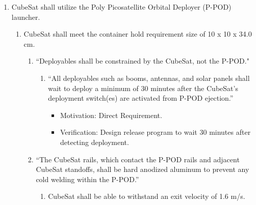 \begin{enumerate}
\begin{enumerate}
\begin{enumerate}
\begin{enumerate}
                \begin{itemize}
                        \item Motivation: Delicate components such as PCBs and antenna have natural frequencies which must be avoided to avoid resonance. Resonance could result in the failure of components.
                        \item Verification: Use ANSYS model analysis features on specific parts and on the assembled CAD model.
                    \end{itemize}
        \end{enumerate}
        \end{enumerate}
    \end{enumerate}  %
    \item CubeSat shall utilize the Poly Picosatellite Orbital Deployer (P-POD) launcher.
    \begin{enumerate}
        \item CubeSat shall meet the container hold requirement size of 10 x 10 x 34.0 cm. 
        \begin{enumerate}
            \item  “Deployables shall be constrained by the CubeSat, not the P-POD." \cite{CSS} 
                \begin{enumerate}
                    \item “All deployables such as booms, antennas, and solar panels shall wait to deploy a minimum of 30 minutes after the CubeSat's deployment switch(es) are activated from P-POD ejection.” \cite{CSS} 
                        \begin{itemize}
                            \item Motivation: Direct Requirement.
                            \item Verification: Design release program to wait 30 minutes after detecting deployment. 
                        \end{itemize}
                \end{enumerate}
            \item  “The CubeSat rails, which contact the P-POD rails and adjacent CubeSat standoffs, shall be hard anodized aluminum to prevent any cold welding within the P-POD.” \cite{CSS} 
                \begin{enumerate}
                    \item CubeSat shall be able to withstand an exit velocity of 1.6 m/s\cite{10Launch}. 
                           \begin{itemize}

\end{itemize}
\end{enumerate}
\end{enumerate}
\end{enumerate}
\end{enumerate}
